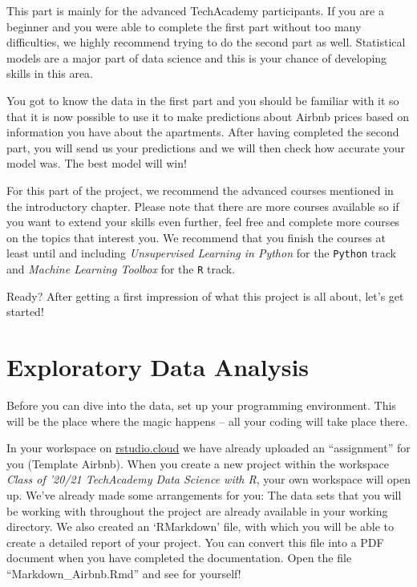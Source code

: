 \documentclass[
  11pt,
]{article}
\newenvironment{tips}[1]
  {
  \begin{itemize}
  \footnotesize
  \renewcommand{\labelitemi}{
    \raisebox{-.7\height}[0pt][0pt]{
      {\setkeys{Gin}{width=3em,keepaspectratio}
        \texttt{[image: images/\#1.png]}}
    }
  }
  \setlength{\fboxsep}{1em}
  \begin{rbox}
  \item
  }
  {
  \end{rbox}
  \end{itemize}
  }
\begin{document}
This part is mainly for the advanced TechAcademy participants. If you are a beginner and you were able to complete the first part without too many difficulties, we highly recommend trying to do the second part as well. Statistical models are a major part of data science and this is your chance of developing skills in this area.

You got to know the data in the first part and you should be familiar with it so that it is now possible to use it to make predictions about Airbnb prices based on information you have about the apartments. After having completed the second part, you will send us your predictions and we will then check how accurate your model was. The best model will win!

For this part of the project, we recommend the advanced courses mentioned in the introductory chapter. Please note that there are more courses available so if you want to extend your skills even further, feel free and complete more courses on the topics that interest you. We recommend that you finish the courses at least until and including \emph{Unsupervised Learning in Python} for the \texttt{Python} track and \emph{Machine Learning Toolbox} for the \texttt{R} track.

Ready? After getting a first impression of what this project is all about, let's get started!

\newpage

\hypertarget{exploratory-data-analysis}{%
\section{Exploratory Data Analysis}\label{exploratory-data-analysis}}

Before you can dive into the data, set up your programming environment. This will be the place where the magic happens -- all your coding will take place there.

\begin{tips}r

In your workspace on \href{https://rstudio.cloud/projects}{rstudio.cloud} we have already uploaded an ``assignment'' for you (Template Airbnb). When you create a new project within the workspace \emph{Class of '20/21 \textbar{} TechAcademy \textbar{} Data Science with R}, your own workspace will open up. We've already made some arrangements for you: The data sets that you will be working with throughout the project are already available in your working directory. We also created an `RMarkdown' file, with which you will be able to create a detailed report of your project. You can convert this file into a PDF document when you have completed the documentation. Open the file ``Markdown\_Airbnb.Rmd'' and see for yourself!

\end{tips}
\end{document}
